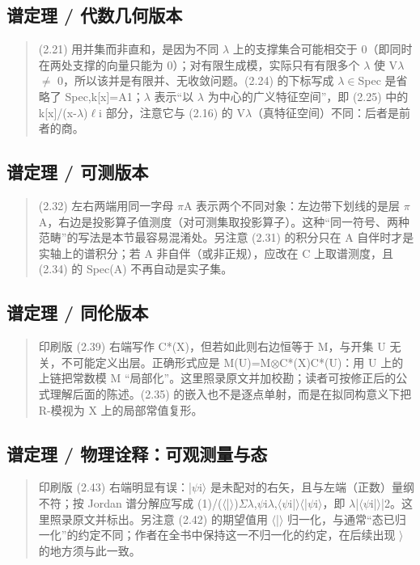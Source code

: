 \subsection*{谱定理 / 代数几何版本}
\begin{quote}\small
(2.21) 用并集而非直和，是因为不同 $\lambda$ 上的支撑集合可能相交于 0（即同时在两处支撑的向量只能为 0）；对有限生成模，实际只有有限多个 $\lambda$ 使 V$\lambda$$\neq$ 0，所以该并是有限并、无收敛问题。(2.24) 的下标写成 $\lambda$$\in$Spec 是省略了 Spec,k[x]=A1；$\lambda$ 表示“以 $\lambda$ 为中心的广义特征空间”，即 (2.25) 中的 k[x]/(x-$\lambda$)$\ell$i 部分，注意它与 (2.16) 的 V$\lambda$（真特征空间）不同：后者是前者的商。
\end{quote}

\subsection*{谱定理 / 可测版本}
\begin{quote}\small
(2.32) 左右两端用同一字母 $\pi$A 表示两个不同对象：左边带下划线的是层 $\pi$A，右边是投影算子值测度（对可测集取投影算子）。这种“同一符号、两种范畴”的写法是本节最容易混淆处。另注意 (2.31) 的积分只在 A 自伴时才是实轴上的谱积分；若 A 非自伴（或非正规），应改在 C 上取谱测度，且 (2.34) 的 Spec(A) 不再自动是实子集。
\end{quote}

\subsection*{谱定理 / 同伦版本}
\begin{quote}\small
印刷版 (2.39) 右端写作 C*(X)，但若如此则右边恒等于 M，与开集 U 无关，不可能定义出层。正确形式应是 M(U)=M$\otimes$C*(X)C*(U)：用 U 上的上链把常数模 M “局部化”。这里照录原文并加校勘；读者可按修正后的公式理解后面的陈述。(2.35) 的嵌入也不是逐点单射，而是在拟同构意义下把 R-模视为 X 上的局部常值复形。
\end{quote}

\subsection*{谱定理 / 物理诠释：可观测量与态}
\begin{quote}\small
印刷版 (2.43) 右端明显有误：|$\psi$i$\rangle$ 是未配对的右矢，且与左端（正数）量纲不符；按 Jordan 谱分解应写成 (1)/($\langle$|$\rangle$)$\Sigma$$\lambda$,$\psi$i$\lambda$,$\langle$$\psi$i|$\rangle$$\langle$|$\psi$i$\rangle$，即 $\lambda$|$\langle$$\psi$i|$\rangle$|2。这里照录原文并标出。另注意 (2.42) 的期望值用 $\langle$|$\rangle$ 归一化，与通常“态已归一化”的约定不同；作者在全书中保持这一不归一化的约定，在后续出现 $\rangle$ 的地方须与此一致。
\end{quote}

